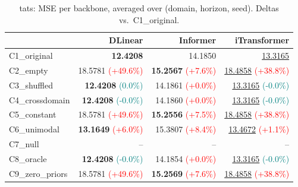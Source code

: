 \begin{table}[t]
\caption{tats: MSE per backbone, averaged over (domain, horizon, seed). Deltas vs.\ C1\_original.}
\label{tab:bb_tats}
\centering
\small
\begin{tabular}{lrrr}
\toprule
 & DLinear & Informer & iTransformer \\
\midrule
C1\_original & \textbf{12.4208} & 14.1850 & \underline{13.3165} \\
C2\_empty & 18.5781 {\tiny \textcolor{red}{(+49.6\%)}} & \textbf{15.2567} {\tiny \textcolor{red}{(+7.6\%)}} & \underline{18.4858} {\tiny \textcolor{red}{(+38.8\%)}} \\
C3\_shuffled & \textbf{12.4208} {\tiny \textcolor{teal}{(0.0\%)}} & 14.1861 {\tiny \textcolor{red}{(+0.0\%)}} & \underline{13.3165} {\tiny \textcolor{teal}{(-0.0\%)}} \\
C4\_crossdomain & \textbf{12.4208} {\tiny \textcolor{teal}{(-0.0\%)}} & 14.1860 {\tiny \textcolor{red}{(+0.0\%)}} & \underline{13.3165} {\tiny \textcolor{teal}{(-0.0\%)}} \\
C5\_constant & 18.5781 {\tiny \textcolor{red}{(+49.6\%)}} & \textbf{15.2556} {\tiny \textcolor{red}{(+7.5\%)}} & \underline{18.4858} {\tiny \textcolor{red}{(+38.8\%)}} \\
C6\_unimodal & \textbf{13.1649} {\tiny \textcolor{red}{(+6.0\%)}} & 15.3807 {\tiny \textcolor{red}{(+8.4\%)}} & \underline{13.4672} {\tiny \textcolor{red}{(+1.1\%)}} \\
C7\_null & -- & -- & -- \\
C8\_oracle & \textbf{12.4208} {\tiny \textcolor{teal}{(-0.0\%)}} & 14.1854 {\tiny \textcolor{red}{(+0.0\%)}} & \underline{13.3165} {\tiny \textcolor{teal}{(-0.0\%)}} \\
C9\_zero\_priors & 18.5781 {\tiny \textcolor{red}{(+49.6\%)}} & \textbf{15.2569} {\tiny \textcolor{red}{(+7.6\%)}} & \underline{18.4858} {\tiny \textcolor{red}{(+38.8\%)}} \\
\bottomrule
\end{tabular}
\end{table}
